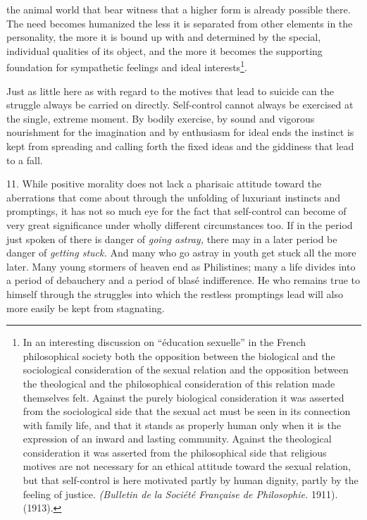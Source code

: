 \documentclass[12pt,a4paper,openany]{book}
\newcommand{\opage}[1]{\marginnote{\footnotesize\textit{[#1]}}}
\begin{document}
the animal world that bear witness that a higher form is already possible there. The need becomes humanized the less
it is separated from other elements in the personality, the more it is bound up with and determined by the special,
individual qualities of its object, and the more it becomes the supporting foundation for sympathetic feelings and
ideal interests\footnote[1]{In an interesting discussion on ``éducation sexuelle'' %
 in the French philosophical
society both the opposition between the biological and the sociological consideration of the sexual relation and
the opposition between the theological and the philosophical consideration of this relation made themselves felt.
Against the purely biological consideration it was asserted from the sociological side that the sexual act must be
seen in its connection with family life, and that it stands as properly human only when it is the expression of an
inward and lasting community. Against the theological consideration it was asserted from the philosophical side that
religious motives are not necessary for an ethical attitude toward the sexual relation, but that self-control is
here motivated partly by human dignity, partly by the feeling of justice. \textit{(Bulletin de la Société Française de Philosophie.} 1911). (1913).}.

Just as little here as with regard to the motives that lead to suicide can the struggle always be carried on
directly. Self-control cannot always be exercised at the single, extreme moment. By bodily exercise, by sound and
vigorous nourishment for the imagination and by enthusiasm for ideal ends the instinct is kept from spreading and
calling forth the fixed ideas and the giddiness that lead to a fall.

11. While positive morality does not lack a pharisaic attitude toward the aberrations that come about through the
unfolding of luxuriant instincts and promptings, it has not so much eye for the fact that self-control can become of
very great
\opage{230}significance under wholly different circumstances too. If in the period just spoken of there is danger of
\textit{going astray,} there may in a later period be danger of \textit{getting stuck.} And many who go astray in
youth get stuck all the more later. Many young stormers of heaven end as Philistines; many a life divides into a
period of debauchery and a period of blasé indifference. He who remains true to himself through the struggles into
which the restless promptings lead will also more easily be kept from stagnating.
\end{document}
